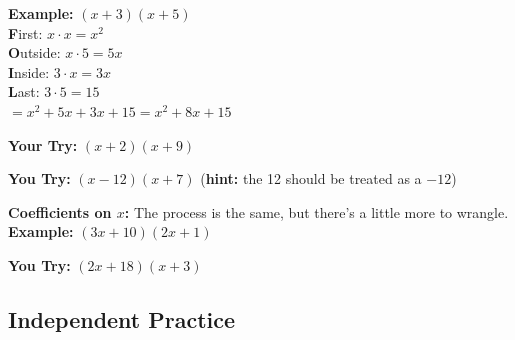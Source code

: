 \documentclass[11pt]{article}
\begin{document}
\textbf{Example:} $(x+3)(x+5)$ \\


\textbf{F}irst: $x \cdot x =x^2$\\
\textbf{O}utside: $x \cdot 5 = 5x$\\
\textbf{I}nside: $3 \cdot x = 3x$\\
\textbf{L}ast: $3 \cdot 5 = 15$\\



$= x^{2}+5x+3x+15 = x^{2}+8x+15$\\

\vspace{1in}

\textbf{Your Try:} $(x+2)(x+9)$

\vspace{1in}

\textbf{You Try:} $(x-12)(x+7)$ (\textbf{hint:} the 12 should be treated as a $-12$)\\

\pagebreak

\hrulefill

\textbf{Coefficients on $x$:} The process is the same, but there's a little more to wrangle.\\

\textbf{Example:} $(3x+10)(2x+1)$\\

\vspace{1in}

\textbf{You Try:} $(2x+18)(x+3)$\\

\vspace{1in}

\subsection*{Independent Practice}
\end{document}
